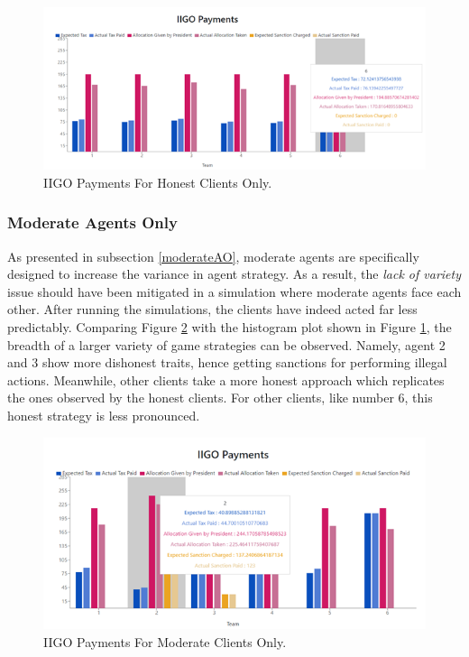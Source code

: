 \begin{figure}[H]
\centering
\includegraphics[scale=0.8]{12_team4_agentdesign/images/IIGOHH.png}
\caption{IIGO Payments For Honest Clients Only.}
\label{fig:IIGOHH}
\end{figure}

\subsubsection{Moderate Agents Only}
As presented in subsection \ref{moderateAO}, moderate agents are specifically designed to increase the variance in agent strategy. As a result, the \emph{lack of variety} issue should have been mitigated in a simulation where moderate agents face each other. After running the simulations, the clients have indeed acted far less predictably. Comparing Figure \ref{fig:IIGOMM} with the histogram plot shown in Figure \ref{fig:IIGOHH}, the breadth of a larger variety of game strategies can be observed. Namely, agent 2 and 3 show more dishonest traits, hence getting sanctions for performing illegal actions. Meanwhile, other clients take a more honest approach which replicates the ones observed by the honest clients. For other clients, like number 6, this honest strategy is less pronounced.

\begin{figure}[H]
\centering
\includegraphics[scale=0.8]{12_team4_agentdesign/images/IIGOMM.png}
\caption{IIGO Payments For Moderate Clients Only.}
\label{fig:IIGOMM}
\end{figure}

